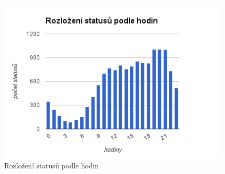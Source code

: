 \documentclass[thesis=M,czech]{FITthesis}[2013/05/10]
\begin{document}
\begin{figure}[h]
\includegraphics[width=5in]{figures/postedHours.png}
\caption{Rozložení statusů podle hodin}
\label{fig:postedHours}
\end{figure}
\end{document}
